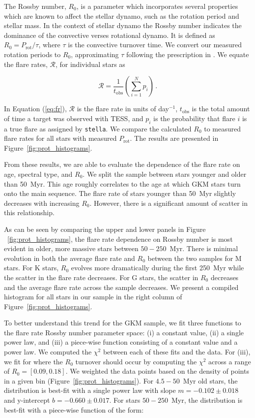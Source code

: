 \documentclass[twocolumn]{aastex631}
\begin{document}
The Rossby number, $R_0$, is a parameter which incorporates  several properties which
are known to affect the stellar dynamo, such as the rotation period and stellar mass.
In the context of stellar dynamo the Rossby number indicates the dominance of the
convective verses rotational dynamo. It is defined as $R_0 = P_\textrm{rot}/\tau$,
where $\tau$ is the convective turnover time. We convert our measured rotation periods
to $R_0$,  approximating $\tau$ following the prescription in \cite{wright11}. We
equate the flare rates, $\mathcal{R}$, for individual stars as

\begin{equation}\label{eq:fr}
  \mathcal{R} = \frac{1}{t_\textrm{obs}} \left( \sum_{i=1}^{N} p_i \right)\,.
\end{equation}

In Equation (\ref{eq:fr}), $\mathcal{R}$ is the flare rate in units of day$^{-1}$,
$t_\textrm{obs}$ is the total amount of time a target was observed with TESS, and
$p_i$ is the probability that flare $i$ is a true flare as assigned by \texttt{stella}.
We compare the calculated $R_0$ to measured flare rates for all stars with measured
$P_\textrm{rot}$. The results are presented in Figure~\ref{fig:prot_histograms}.


From these results, we are able to evaluate the dependence of the flare rate on age,
spectral type,  and $R_0$. We split the sample between stars younger and older than
50~Myr. This age roughly correlates to the age at which GKM stars turn onto the main
sequence. The flare rate of stars younger than 50~Myr slightly decreases with
increasing $R_0$. However, there is a significant amount of scatter in this relationship.

As can be seen by comparing the upper and  lower panels in Figure ~\ref{fig:prot_histograms},
the flare rate dependence on Rossby number is most evident in older, more massive stars
between $50 - 250$~Myr. There is minimal evolution in both the average flare rate
and $R_0$ between the two samples for M stars. For K stars,  $R_0$ evolves more
dramatically during the first 250~Myr while the scatter in the flare rate decreases.
For G stars, the scatter in $R_0$ decreases and the average flare rate across the
sample decreases. We present a compiled histogram for all stars in our sample in the
right column of Figure~\ref{fig:prot_histograms}.

To better understand this trend for the GKM sample, we fit three functions to the
flare rate Rossby number parameter space: (i) a constant value, (ii) a single power
law, and (iii) a piece-wise function consisting of a constant value and a power law.
We computed the $\chi^2$ between each of these fits and the data. For (iii), we fit
for where the $R_0$ turnover should occur by computing the $\chi^2$ across a range
of $R_0 = [0.09, 0.18]$. We weighted the data points based on the density of points
in a given bin (Figure~\ref{fig:prot_histograms}). For  $4.5 - 50$~Myr old stars,
the distribution is best-fit with a single power law with slope $m = -0.102 \pm 0.018$
and y-intercept $b = -0.660 \pm 0.017$. For stars $50 - 250$~Myr, the distribution
is best-fit with a piece-wise function of the form:
\end{document}
